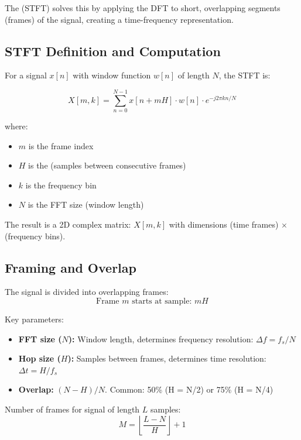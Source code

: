 The  (STFT) solves this by
applying the DFT to short, overlapping segments (frames) of the
signal, creating a time-frequency representation.

\subsection{STFT Definition and Computation}\label{subsec:stft_definition}

For a signal $x[n]$ with window function $w[n]$ of length $N$, the STFT is:

\begin{equation}
  \label{eq:stft}
  X[m, k] = \sum_{n=0}^{N-1} x[n + mH] \cdot w[n] \cdot e^{-j2\pi kn/N}
\end{equation}

where:
\begin{itemize}[itemsep=2pt]
  \item $m$ is the frame index
  \item $H$ is the  (samples between consecutive frames)
  \item $k$ is the frequency bin
  \item $N$ is the FFT size (window length)
\end{itemize}

The result is a 2D complex matrix: $X[m, k]$ with dimensions (time
frames) $\times$ (frequency bins).

\subsection{Framing and Overlap}

The signal is divided into overlapping frames:
\begin{equation}
  \text{Frame } m \text{ starts at sample: } mH
\end{equation}

Key parameters:
\begin{itemize}
  \item \textbf{FFT size ($N$):} Window length, determines frequency
    resolution: $\Delta f = f_s / N$
  \item \textbf{Hop size ($H$):} Samples between frames, determines
    time resolution: $\Delta t = H / f_s$
  \item \textbf{Overlap:} $(N - H) / N$. Common: 50\% (H = N/2) or
    75\% (H = N/4)
\end{itemize}

Number of frames for signal of length $L$ samples:
\begin{equation}
  M = \left\lfloor\frac{L - N}{H}\right\rfloor + 1
\end{equation}

